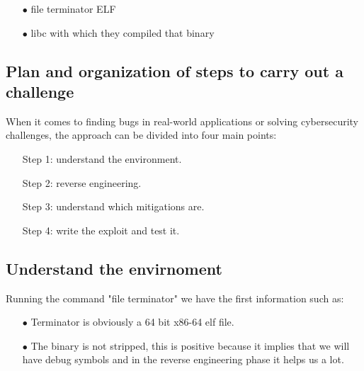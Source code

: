     \begin{itemize}
        \item[$\bullet$] file terminator ELF  
        \item[$\bullet$] libc with which they compiled that binary
    \end{itemize}
    \clearpage
    
    \subsection{Plan and organization of steps to carry out a challenge}
    When it comes to finding bugs in real-world applications or solving cybersecurity challenges, the approach can be divided into four main points: \newline
    \begin{itemize}
        \item[Step 1:] understand the environment.
        \item[Step 2:] reverse engineering.
        \item[Step 3:] understand which mitigations are.
        \item[Step 4:] write the exploit and test it.
    \end{itemize}

    \subsection{Understand the envirnoment}
    Running the command "file terminator"  we have the first information such as:\newline
    \begin{itemize}
        \item[$\bullet$] Terminator is obviously a 64 bit x86-64 elf file.
        \item[$\bullet$] The binary is not stripped, this is positive because it implies that we will have debug symbols and in the reverse engineering phase it helps us a lot.
    \end{itemize}

